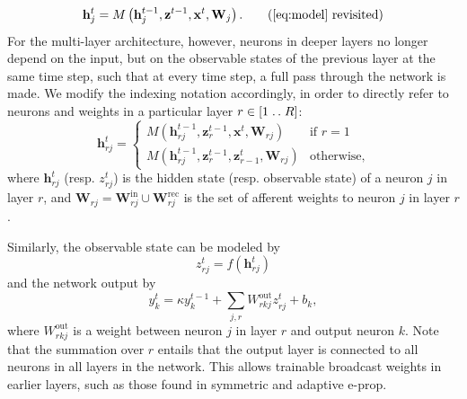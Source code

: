         \begin{equation}
        \mathbf{h}^t_j = M\left(\mathbf{h}_j^{t-1}, \mathbf{z}^{t-1}, \mathbf{x}^t, \mathbf{W}_j\right).\tag{\ref{eq:model} revisited}
        \end{equation}
        For the multi-layer architecture, however, neurons in deeper layers no longer depend on the input, but on the observable states of the previous layer at the same time step, such that at every time step, a full pass through the network is made.
        We modify the indexing notation accordingly, in order to directly refer to neurons and weights in a particular layer $r \in [1\mathrel{{.}\,{.}}\nobreak R]$:
        \begin{equation}\label{eq:ml_model}
        \mathbf{h}^t_{rj} = \begin{cases}
        M\left(\mathbf{h}_{rj}^{t-1}, \mathbf{z}_r^{t-1}, \mathbf{x}^t, \mathbf{W}_{rj}\right)       & \mbox{if } r = 1\\
        M\left(\mathbf{h}_{rj}^{t-1}, \mathbf{z}_r^{t-1}, \mathbf{z}_{r-1}^t, \mathbf{W}_{rj}\right) & \mbox{otherwise,}
        \end{cases}
        \end{equation}
        where $\mathbf{h}^t_{rj}$ (resp. $z^t_{rj}$) is the hidden state (resp. observable state) of a neuron $j$ in layer $r$, and $\mathbf{W}_{rj} = \mathbf{W}^\text{in}_{rj} \cup \mathbf{W}^\text{rec}_{rj}$ is the set of afferent weights to neuron $j$ in layer $r$.

        Similarly, the observable state can be modeled by
        \begin{equation}\label{eq:ml_model_obs}
        z^t_{rj} = f\left(\mathbf{h}_{rj}^t\right)
        \end{equation}
        and the network output by
        \begin{equation}
        y^t_k = \kappa y^{t-1}_k + \sum_{j,r}W^\text{out}_{rkj}z_{rj}^t + b_k,
        \end{equation}
        where $W^\text{out}_{rkj}$ is a weight between neuron $j$ in layer $r$ and output neuron $k$.
        Note that the summation over $r$ entails that the output layer is connected to all neurons in all layers in the network.
        This allows trainable broadcast weights in earlier layers, such as those found in symmetric and adaptive e-prop.


